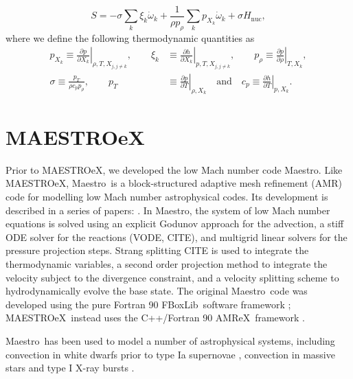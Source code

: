 \documentclass[a4paper]{jpconf}
\newcommand{\maestro}{{\sffamily Maestro}}
\newcommand{\maestroex}{{\sffamily MAESTROeX}}
\newcommand{\amrex}{{\sffamily AMReX}}
\newcommand{\fboxlib}{{\sffamily FBoxLib}}
\newcommand{\pd}[2]{\frac{\partial #1}{\partial #2}}
\begin{document}
\begin{equation}
    S = -\sigma \sum_k \xi_k\dot{\omega}_k + \frac{1}{\rho p_\rho}\sum_k p_{X_k}\dot{\omega}_k + \sigma H_{\mathrm{nuc}},
\end{equation}
where we define the following thermodynamic quantities as
\begin{align*}
    p_{X_k} \equiv \left.\pd{p}{X_k}\right|_{\rho,T,X_{j,j\neq k}},\qquad
     \xi_k&\equiv \left.\pd{h}{X_k}\right|_{p, T,X_{j,j\neq k}},\qquad
     p_\rho\equiv \left.\pd{p}{\rho}\right|_{T, X_k},\\
     \sigma \equiv \frac{p_T}{\rho c_p p_\rho}, \qquad
     p_T&\equiv \left.\pd{p}{T}\right|_{\rho, X_k} \quad\mathrm{and}\quad 
     c_p\equiv \left.\pd{h}{T}\right|_{p, X_k}.
\end{align*}


\section{MAESTROeX} \label{sec:maestroex}



Prior to \maestroex, we developed the low Mach number code \maestro. Like \maestroex, \maestro~is a block-structured adaptive mesh refinement (AMR) code for modelling low Mach number astrophysical codes. Its development is described in a series of papers: \cite{Almgren2006a,Almgren2006b,Almgren2008a,Zingale2009,Nonaka2010}. In \maestro, the system of low Mach number equations is solved using an explicit Godunov approach for the advection, a stiff ODE solver for the reactions (VODE, CITE), and multigrid linear solvers for the pressure projection steps. Strang splitting CITE is used to integrate the thermodynamic variables, a second order projection method to integrate the velocity subject to the divergence constraint, and a velocity splitting scheme to hydrodynamically evolve the base state. The original \maestro~code was developed using the pure Fortran 90 \fboxlib~software framework \cite{Zhang2016}; \maestroex~instead uses the C++/Fortran 90 \amrex~framework \cite{Zhang2019}. 

\maestro~has been used to model a number of astrophysical systems, including convection in white dwarfs prior to type Ia supernovae \cite{Zingale2011,Nonaka2011,Malone2014a,Zingale2013,Jacobs2016}, convection in massive stars \cite{Gilet2013} and type I X-ray bursts \cite{Malone2011,Malone2014,Zingale2015}. 
\end{document}
